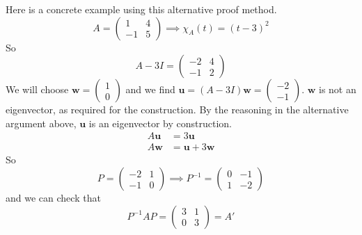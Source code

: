 \documentclass{article}
\begin{document}
	Here is a concrete example using this alternative proof method.
	\[ A = \begin{pmatrix}
		1 & 4 \\ -1 & 5
	\end{pmatrix} \implies \chi_A(t) = (t - 3)^2 \]
	So
	\[ A - 3I = \begin{pmatrix}
		-2 & 4 \\ -1 & 2
	\end{pmatrix} \]
	We will choose $\bm w = \begin{pmatrix}
		1 \\ 0
	\end{pmatrix}$ and we find $\bm u = (A - 3I)\bm w = \begin{pmatrix}
		-2 \\ -1
	\end{pmatrix}$. $\bm w$ is not an eigenvector, as required for the construction. By the reasoning in the alternative argument above, $\bm u$ is an eigenvector by construction.
	\begin{align*}
		A\bm u &= 3\bm u \\
		A\bm w &= \bm u + 3\bm w
	\end{align*}
	So
	\[ P = \begin{pmatrix}
		-2 & 1 \\ -1 & 0
	\end{pmatrix} \implies P^{-1} = \begin{pmatrix}
		0 & -1 \\ 1 & -2
	\end{pmatrix} \]
	and we can check that
	\[ P^{-1}AP = \begin{pmatrix}
		3 & 1 \\ 0 & 3
	\end{pmatrix} = A' \]
\end{document}
